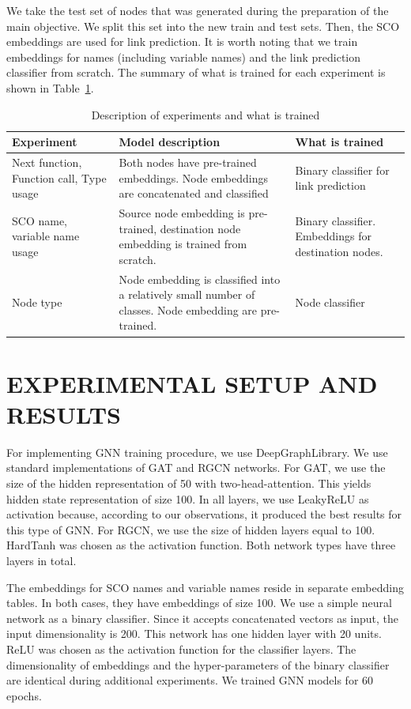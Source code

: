 \documentclass[a4paper,twoside]{article}
\begin{document}
We take the test set of nodes that was generated during the preparation of the main objective. We split this set into the new train and test sets. Then, the SCO embeddings are used for link prediction. It is worth noting that we train embeddings for names (including variable names) and the link prediction classifier from scratch. The summary of what is trained for each experiment is shown in Table~\ref{tbl:experiment_desc}.

\begin{table}
    \centering
    \caption{Description of experiments and what is trained}\label{tbl:experiment_desc}
    \begin{tabular}{p{3cm}p{6cm}p{5cm}}
    \toprule
        \textbf{Experiment} & \textbf{Model description} & \textbf{What is trained} \\ \midrule
        Next function, Function call, Type usage & Both nodes have pre-trained embeddings. Node embeddings are concatenated and classified & Binary classifier for link prediction \\ \midrule
        SCO name, variable name usage & Source node embedding is pre-trained, destination node embedding is trained from scratch. & Binary classifier. Embeddings for destination nodes. \\ \midrule
        Node type & Node embedding is classified into a relatively small number of classes. Node embedding are pre-trained. & Node classifier \\ \bottomrule
    \end{tabular}
\end{table}



\section{\uppercase{Experimental Setup and Results}}\label{sec:setup}

For implementing GNN training procedure, we use DeepGraphLibrary. We use standard implementations of GAT and RGCN networks. For GAT, we use the size of the hidden representation of 50 with two-head-attention. This yields hidden state representation of size 100. In all layers, we use LeakyReLU as activation because, according to our observations, it produced the best results for this type of GNN\@. For RGCN, we use the size of hidden layers equal to 100. HardTanh was chosen as the activation function. Both network types have three layers in total. 

The embeddings for SCO names and variable names reside in separate embedding tables. In both cases, they have embeddings of size 100. We use a simple neural network as a binary classifier. Since it accepts concatenated vectors as input, the input dimensionality is 200. This network has one hidden layer with 20 units. ReLU was chosen as the activation function for the classifier layers. The dimensionality of embeddings and the hyper-parameters of the binary classifier are identical during additional experiments. We trained GNN models for 60 epochs.
\end{document}
